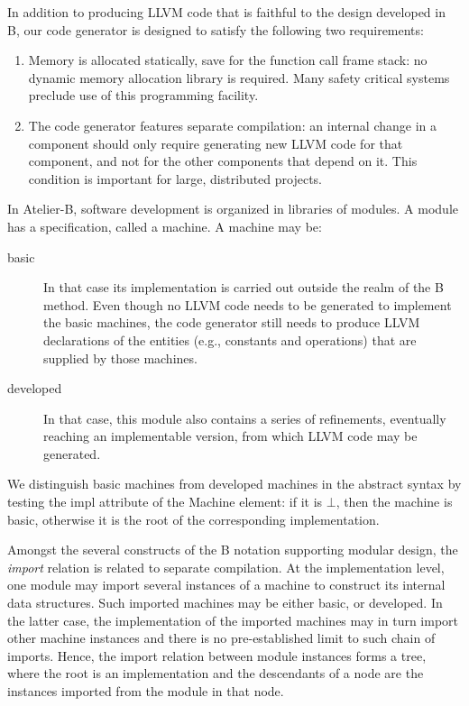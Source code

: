 \documentclass{llncs}
\newcommand{\B}[1]{\textsf{#1}}
\begin{document}
In addition to producing LLVM code that is faithful to the design developed in
B, our code generator is designed to satisfy the following two requirements:
\begin{enumerate}
\item Memory is allocated statically, save for the function call frame stack: no
  dynamic memory allocation library is required. Many safety critical systems
  preclude use of this programming facility.
\item The code generator features separate compilation: an internal change in a
  component should only require generating new LLVM code for that component, and
  not for the other components that depend on it. This condition is important
  for large, distributed projects.
\end{enumerate}

In Atelier-B, software development is organized in libraries of modules. A
module has a specification, called a machine. A machine may be:
\begin{description}
\item[basic] In that case its implementation is carried out outside the realm of
  the B method. Even though no LLVM code needs to be generated to implement the
  basic machines, the code generator still needs to produce LLVM declarations of
  the entities (e.g., constants and operations) that are supplied by those
  machines.
\item[developed] In that case, this module also contains a series of
  refinements, eventually reaching an implementable version, from which LLVM
  code may be generated.
\end{description}
We distinguish basic machines from developed machines in the abstract syntax by
testing the \B{impl} attribute of the \B{Machine} element: if it is $\bot$, then
the machine is basic, otherwise it is the root of the corresponding
implementation.

Amongst the several constructs of the B notation supporting modular design, the
\emph{import} relation is related to separate compilation. At the implementation
level, one module may import several instances of a machine to construct its
internal data structures. Such imported machines may be either basic, or
developed. In the latter case, the implementation of the imported machines may
in turn import other machine instances and there is no pre-established limit to
such chain of imports. Hence, the import relation between module instances forms
a tree, where the root is an implementation and the descendants of a node are
the instances imported from the module in that node. 
\end{document}
